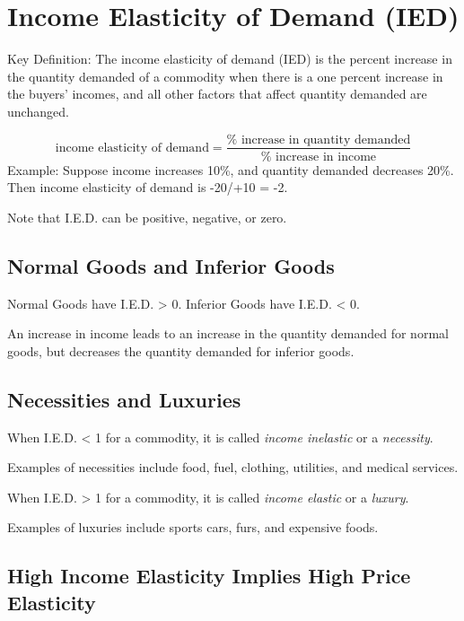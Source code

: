 \documentclass[
  letterpaper,
]{book}
\begin{document}
\section{Income Elasticity of Demand
(IED)}\label{income-elasticity-of-demand-ied}

Key Definition: The income elasticity of demand (IED) is the percent
increase in the quantity demanded of a commodity when there is a one
percent increase in the buyers' incomes, and all other factors that
affect quantity demanded are unchanged.

\[
\text{income elasticity of demand}=\frac{\text{%
\] Example: Suppose income increases 10\%, and quantity demanded
decreases 20\%. Then income elasticity of demand is -20/+10 = -2.

Note that I.E.D. can be positive, negative, or zero.

\subsection{Normal Goods and Inferior
Goods}\label{normal-goods-and-inferior-goods}

Normal Goods have I.E.D. \textgreater{} 0. Inferior Goods have I.E.D.
\textless{} 0.

An increase in income leads to an increase in the quantity demanded for
normal goods, but decreases the quantity demanded for inferior goods.

\subsection{Necessities and Luxuries}\label{necessities-and-luxuries}

When I.E.D. \textless{} 1 for a commodity, it is called \emph{income
inelastic} or a \emph{necessity}.

Examples of necessities include food, fuel, clothing, utilities, and
medical services.

When I.E.D. \textgreater{} 1 for a commodity, it is called \emph{income
elastic} or a \emph{luxury}.

Examples of luxuries include sports cars, furs, and expensive foods.

\subsection{High Income Elasticity Implies High Price
Elasticity}\label{high-income-elasticity-implies-high-price-elasticity}
\end{document}
